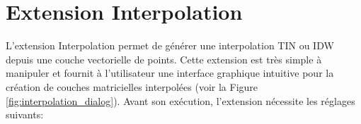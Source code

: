 
\section{Extension Interpolation}\label{sec:interpol}


L'extension Interpolation permet de g\'en\'erer une interpolation TIN ou IDW 
depuis une couche vectorielle de points. Cette extension est tr\`es simple \`a 
manipuler et fournit \`a l'utilisateur une interface graphique intuitive pour la
cr\'eation de couches matricielles interpol\'ees (voir la Figure \ref{fig:interpolation_dialog}).
Avant son ex\'ecution, l'extension n\'ecessite les r\'eglages suivants:

